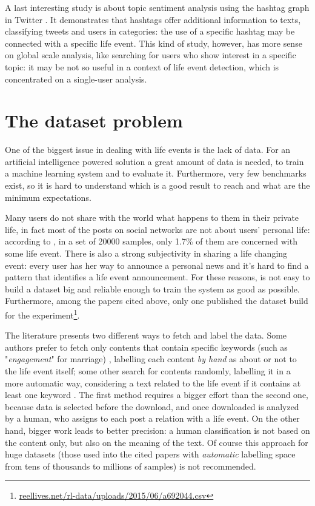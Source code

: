 A last interesting study is about topic sentiment analysis using the hashtag graph in Twitter \cite{wang2011topic}. It demonstrates that hashtags offer additional information to texts, classifying tweets and users in categories: the use of a specific hashtag may be connected with a specific life event. This kind of study, however, has more sense on global scale analysis, like searching for users who show interest in a specific topic: it may be not so useful in a context of life event detection, which is concentrated on a single-user analysis.


\section{The dataset problem}
\label{sec:dataset}
One of the biggest issue in dealing with life events is the lack of data. For an artificial intelligence powered solution a great amount of data is needed, to train a machine learning system and to evaluate it. Furthermore, very few benchmarks exist, so it is hard to understand which is a good result to reach and what are the minimum expectations.

Many users do not share with the world what happens to them in their private life, in fact most of the posts on social networks are not about users' personal life: according to \cite{moyanolife}, in a set of 20000 samples, only 1.7\% of them are concerned with some life event. There is also a strong subjectivity in sharing a life changing event: every user has her way to announce a personal news and it's hard to find a pattern that identifies a life event announcement. For these reasons, is not easy to build a dataset big and reliable enough to train the system as good as possible. Furthermore, among the papers cited above, only one \cite{dickinson2015identifying} published the dataset build for the experiment\footnote{\url{reellives.net/rl-data/uploads/2015/06/a692044.csv}}.

The literature presents two different ways to fetch and label the data. Some authors prefer to fetch only contents that contain specific keywords (such as "\emph{engagement}" for marriage) \cite{dickinson2015identifying, khobarekar2013detecting}, labelling each content \emph{by hand} as about or not to the life event itself; some other search for contents randomly, labelling it in a more automatic way, considering a text related to the life event if it contains at least one keyword \cite{choudhury2014personal, di2013detecting, moyanolife}. The first method requires a bigger effort than the second one, because data is selected before the download, and once downloaded is analyzed by a human, who assigns to each post a relation with a life event. On the other hand, bigger work leads to better precision: a human classification is not based on the content only, but also on the meaning of the text. Of course this approach for huge datasets (those used into the cited papers with \emph{automatic} labelling space from tens of thousands to millions of samples) is not recommended. 

